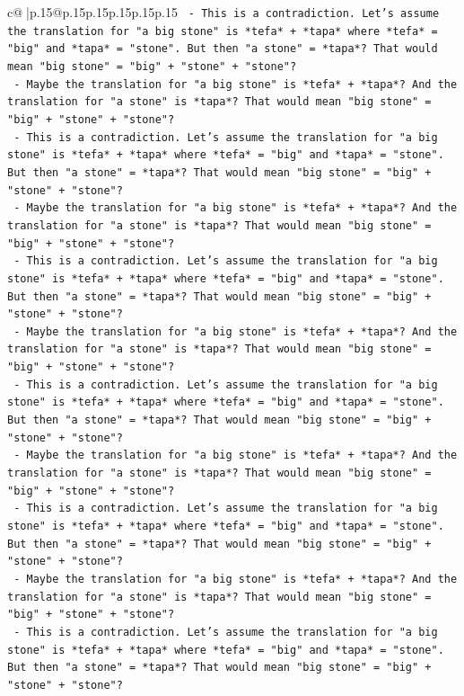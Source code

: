 \documentclass{article}
\begin{document}
{\begin{supertabular}{c@{$\;$}|p{.15\linewidth}@{}p{.15\linewidth}p{.15\linewidth}p{.15\linewidth}p{.15\linewidth}p{.15\linewidth}}
{{{\texttt{        {-} This is a contradiction. Let's assume the translation for "a big stone" is *tefa* + *tapa* where *tefa* = "big" and *tapa* = "stone". But then "a stone" = *tapa*? That would mean "big stone" = "big" + "stone" + "stone"?} \\
\texttt{        {-} Maybe the translation for "a big stone" is *tefa* + *tapa*? And the translation for "a stone" is *tapa*? That would mean "big stone" = "big" + "stone" + "stone"?} \\
\texttt{        {-} This is a contradiction. Let's assume the translation for "a big stone" is *tefa* + *tapa* where *tefa* = "big" and *tapa* = "stone". But then "a stone" = *tapa*? That would mean "big stone" = "big" + "stone" + "stone"?} \\
\texttt{        {-} Maybe the translation for "a big stone" is *tefa* + *tapa*? And the translation for "a stone" is *tapa*? That would mean "big stone" = "big" + "stone" + "stone"?} \\
\texttt{        {-} This is a contradiction. Let's assume the translation for "a big stone" is *tefa* + *tapa* where *tefa* = "big" and *tapa* = "stone". But then "a stone" = *tapa*? That would mean "big stone" = "big" + "stone" + "stone"?} \\
\texttt{        {-} Maybe the translation for "a big stone" is *tefa* + *tapa*? And the translation for "a stone" is *tapa*? That would mean "big stone" = "big" + "stone" + "stone"?} \\
\texttt{        {-} This is a contradiction. Let's assume the translation for "a big stone" is *tefa* + *tapa* where *tefa* = "big" and *tapa* = "stone". But then "a stone" = *tapa*? That would mean "big stone" = "big" + "stone" + "stone"?} \\
\texttt{        {-} Maybe the translation for "a big stone" is *tefa* + *tapa*? And the translation for "a stone" is *tapa*? That would mean "big stone" = "big" + "stone" + "stone"?} \\
\texttt{        {-} This is a contradiction. Let's assume the translation for "a big stone" is *tefa* + *tapa* where *tefa* = "big" and *tapa* = "stone". But then "a stone" = *tapa*? That would mean "big stone" = "big" + "stone" + "stone"?} \\
\texttt{        {-} Maybe the translation for "a big stone" is *tefa* + *tapa*? And the translation for "a stone" is *tapa*? That would mean "big stone" = "big" + "stone" + "stone"?} \\
\texttt{        {-} This is a contradiction. Let's assume the translation for "a big stone" is *tefa* + *tapa* where *tefa* = "big" and *tapa* = "stone". But then "a stone" = *tapa*? That would mean "big stone" = "big" + "stone" + "stone"?} \\
}}}
\end{supertabular}}
\end{document}
